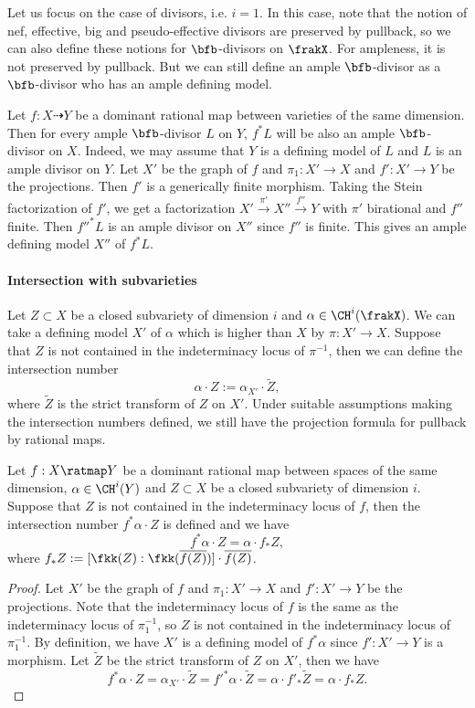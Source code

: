 Let us focus on the case of divisors, i.e. $i=1$.
In this case, note that the notion of nef, effective, big and pseudo-effective divisors are preserved by pullback, so we can also define these notions for $\bfb$-divisors on $\frakX$.
For ampleness, it is not preserved by pullback.
But we can still define an ample $\bfb$-divisor as a $\bfb$-divisor who has an ample defining model.

Let $f: X \dashrightarrow Y$ be a dominant rational map between varieties of the same dimension.
Then for every ample $\bfb$-divisor $L$ on $Y$, $f^* L$ will be also an ample $\bfb$-divisor on $X$.
Indeed, we may assume that $Y$ is a defining model of $L$ and $L$ is an ample divisor on $Y$.
Let $X'$ be the graph of $f$ and $\pi_1: X' \to X$ and $f': X' \to Y$ be the projections.
Then $f'$ is a generically finite morphism.
Taking the Stein factorization of $f'$, we get a factorization $X' \xrightarrow{\pi'} X'' \xrightarrow{f''} Y$ with $\pi'$ birational and $f''$ finite.
Then $f''^* L$ is an ample divisor on $X''$ since $f''$ is finite.
This gives an ample defining model $X''$ of $f^* L$.

\paragraph{Intersection with subvarieties}
Let $Z \subset X$ be a closed subvariety of dimension $i$ and $\alpha \in \CH^i(\frakX)$.
We can take a defining model $X'$ of $\alpha$ which is higher than $X$ by $\pi: X' \to X$.
Suppose that $Z$ is not contained in the indeterminacy locus of $\pi^{-1}$, then we can define the intersection number
\[ \alpha \cdot Z := \alpha_{X'} \cdot \tilde{Z}, \]
where $\tilde{Z}$ is the strict transform of $Z$ on $X'$.
Under suitable assumptions making the intersection numbers defined, we still have the projection formula for pullback by rational maps.

\begin{proposition}\label{prop:projection_formula_for_pullback_by_rational_maps}
	Let $f: X \ratmap Y$ be a dominant rational map between spaces of the same dimension, $\alpha \in \CH^i(Y)$ and $Z \subset X$ be a closed subvariety of dimension $i$.
	Suppose that $Z$ is not contained in the indeterminacy locus of $f$, then the intersection number $f^* \alpha \cdot Z$ is defined and we have
	\[ f^* \alpha \cdot Z = \alpha \cdot f_*Z, \]
	where $f_*Z := [\fkk(Z) : \fkk(\overline{f(Z)})] \cdot \overline{f(Z)}$.
\end{proposition}
\begin{proof}
	Let $X'$ be the graph of $f$ and $\pi_1: X' \to X$ and $f': X' \to Y$ be the projections.
	Note that the indeterminacy locus of $f$ is the same as the indeterminacy locus of $\pi_1^{-1}$, so $Z$ is not contained in the indeterminacy locus of $\pi_1^{-1}$.
	By definition, we have $X'$ is a defining model of $f^* \alpha$ since $f': X' \to Y$ is a morphism.
	Let $\tilde{Z}$ be the strict transform of $Z$ on $X'$, then we have
	\[ f^* \alpha \cdot Z = \alpha_{X'} \cdot \tilde{Z} = f'^* \alpha \cdot \tilde{Z} = \alpha \cdot f'_* \tilde{Z} = \alpha \cdot f_*Z. \]
\end{proof}





